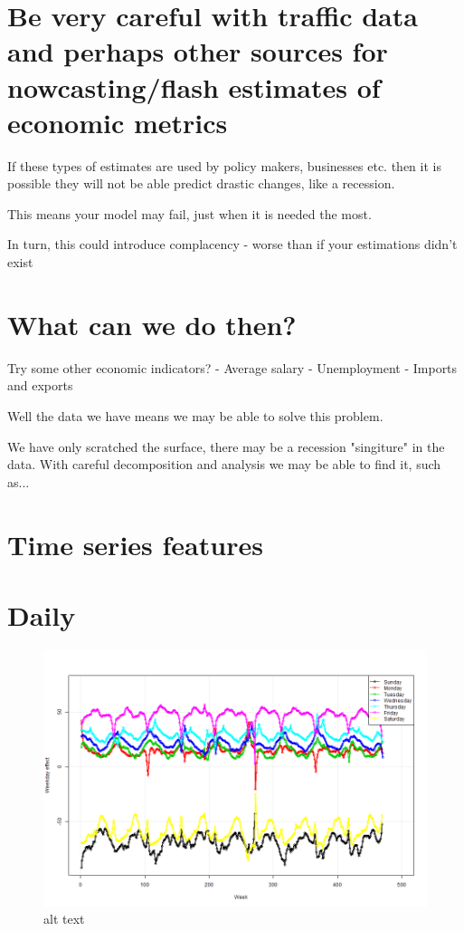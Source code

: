 \documentclass[11pt]{article}
\makeatletter
\def\maxwidth{\ifdim\Gin@nat@width>\linewidth\linewidth
    \else\Gin@nat@width\fi}
\let\Oldincludegraphics\includegraphics
\renewcommand{\includegraphics}[1]{\Oldincludegraphics[width=.8\maxwidth]{#1}}
\makeatother
\begin{document}
    \section{\texorpdfstring{Be \textbf{very} careful with traffic data and
perhaps other sources for nowcasting/flash estimates of economic
metrics}{Be very careful with traffic data and perhaps other sources for nowcasting/flash estimates of economic metrics}}\label{be-very-careful-with-traffic-data-and-perhaps-other-sources-for-nowcastingflash-estimates-of-economic-metrics}

    If these types of estimates are used by policy makers, businesses etc.
then it is possible they will not be able predict drastic changes, like
a recession.

    This means your model may fail, just when it is needed the most.

    In turn, this could introduce complacency - worse than if your
estimations didn't exist

    \section{What can we do then?}\label{what-can-we-do-then}

    Try some other economic indicators? - Average salary - Unemployment -
Imports and exports

Well the data we have means we may be able to solve this problem.

We have only scratched the surface, there may be a recession "singiture"
in the data. With careful decomposition and analysis we may be able to
find it, such as...

    \section{Time series features}\label{time-series-features}

    \section{Daily}\label{daily}

\begin{figure}[htbp]
\centering
\includegraphics{images/days of the week 2.png}
\caption{alt text}
\end{figure}
\end{document}
